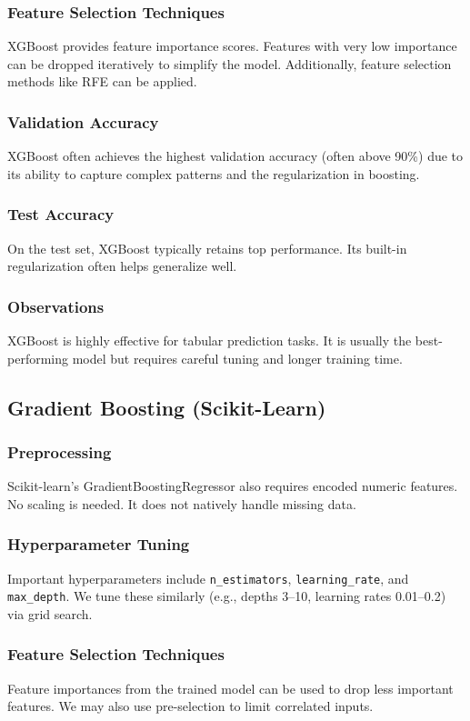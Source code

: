 \documentclass[12pt]{article}
\begin{document}
\subsubsection{Feature Selection Techniques}
XGBoost provides feature importance scores. Features with very low importance can be dropped iteratively to simplify the model. Additionally, feature selection methods like RFE can be applied.
\subsubsection{Validation Accuracy}
XGBoost often achieves the highest validation accuracy (often above 90\%) due to its ability to capture complex patterns and the regularization in boosting.
\subsubsection{Test Accuracy}
On the test set, XGBoost typically retains top performance. Its built-in regularization often helps generalize well.
\subsubsection{Observations}
XGBoost is highly effective for tabular prediction tasks. It is usually the best-performing model but requires careful tuning and longer training time.

\subsection{Gradient Boosting (Scikit-Learn)}
\subsubsection{Preprocessing}
Scikit-learn's GradientBoostingRegressor also requires encoded numeric features. No scaling is needed. It does not natively handle missing data.
\subsubsection{Hyperparameter Tuning}
Important hyperparameters include \texttt{n\_estimators}, \texttt{learning\_rate}, and \texttt{max\_depth}. We tune these similarly (e.g., depths 3--10, learning rates 0.01--0.2) via grid search.
\subsubsection{Feature Selection Techniques}
Feature importances from the trained model can be used to drop less important features. We may also use pre-selection to limit correlated inputs.
\end{document}

